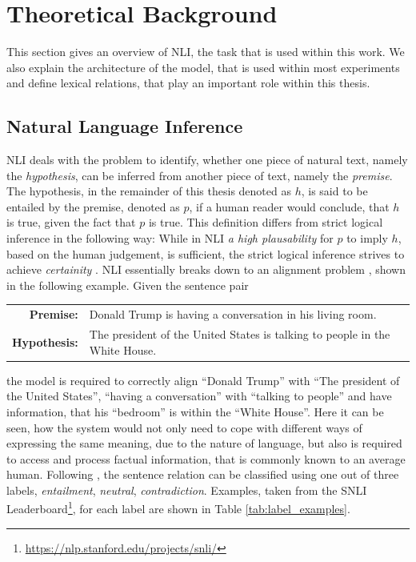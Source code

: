 \section{Theoretical Background}\label{sec:basics}
This section gives an overview of \ac{NLI}, the task that is used within this work. We also explain the architecture of the model, that is used within most experiments and define lexical relations, that play an important role within this thesis.
\subsection{Natural Language Inference}\label{sec:basics_nli}
\ac{NLI} \citep{bowman2015large} deals with the problem to identify, whether one piece of natural text, namely the \textit{hypothesis}, can be inferred from another piece of text, namely the \textit{premise}. The hypothesis, in the remainder of this thesis denoted as $h$, is said to be entailed by the premise, denoted as $p$, if a human reader would conclude, that $h$ is true, given the fact that $p$ is true. This definition differs from strict logical inference in the following way: While in \ac{NLI} \textit{a high plausability} for $p$ to imply $h$, based on the human judgement, is sufficient, the strict logical inference strives to achieve \textit{certainity} \citep{dagan2009recognizing}. \ac{NLI} essentially breaks down to an alignment problem \citep{maccartney2008phrase}, shown in the following example. Given the sentence pair
\begin{center}
\begin{tabular}{rl}
\textbf{Premise:} & Donald Trump is having a conversation in his living room. \\
\textbf{Hypothesis:} & The president of the United States is talking to people in the White House. 
\end{tabular}
\end{center}
the model is required to correctly align ``Donald Trump'' with ``The president of the United States'', ``having a conversation'' with ``talking to people'' and have information, that his ``bedroom'' is within the ``White House''. Here it can be seen, how the system would not only need to cope with different ways of expressing the same meaning, due to the nature of language, but also is required to access and process factual information, that is commonly known to an average human. Following \cite{bowman2015large}, the sentence relation can be classified using one out of three labels, \textit{entailment}, \textit{neutral}, \textit{contradiction}. Examples, taken from the SNLI Leaderboard\footnote{\href{https://nlp.stanford.edu/projects/snli/}{https://nlp.stanford.edu/projects/snli/}}, for each label are shown in Table \ref{tab:label_examples}.
